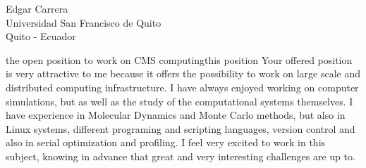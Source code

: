 \documentclass{letter}
\begin{document}
\begin{letter}{Edgar Carrera\\
Universidad San Francisco de Quito\\
Quito - Ecuador}

\begin{content}{the open position to work on CMS computing}{this position}
Your offered position is very attractive to me because it offers
the possibility to work on large scale and distributed computing
infrastructure. I have always enjoyed working on computer
simulations, but as well as the study of the computational systems
themselves. I have experience in Molecular Dynamics and Monte Carlo
methods, but also in Linux systems, different programing and scripting
languages, version control and also in serial optimization and
profiling. I feel very excited to work in this subject, knowing
in advance that great and very interesting challenges are up to.

\end{content}

\end{letter}
\end{document}

